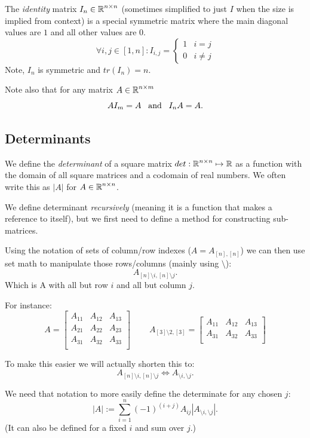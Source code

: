 The \emph{identity} matrix $I_n \in\operatorname{\mathbb{R}}^{n\times n}$ (sometimes simplified to just $I$ when the size is implied from context) 
is a special symmetric matrix where the main diagonal values are $1$ and all other values are $0$.
\[
\forall i,j \in [1,n]: I_{i,j} = \begin{cases} 1 & i=j\\ 0 & i\ne j\end{cases}
\]
Note, $I_n$ is symmetric and $tr(I_n)=n$.

Note also that for any matrix $A\in\operatorname{\mathbb{R}}^{n\times m}$ 
\[
AI_m = A \;\;\;\textnormal{and}\;\;\; I_nA = A.
\]


\subsection{Determinants}
We define the \emph{determinant} of a square matrix $det: \operatorname{\mathbb{R}}^{n\times n} \mapsto \operatorname{\mathbb{R}}$ 
as a function with the domain of all square matrices and a codomain of real numbers. 
We often write this as $|A|$ for $A\in\operatorname{\mathbb{R}}^{n\times n}$. 

We define determinant \emph{recursively} (meaning it is a function that makes a reference to itself), 
but we first need to define a method for constructing sub-matrices. 

Using the notation of sets of column/row indexes ($A = A_{[n],[n]}$) we can then use set math to manipulate those rows/columns (mainly using $\setminus$): 
\[A_{[n]\setminus i,[n]\setminus j}.\]
Which is A with all but row $i$ and all but column $j$. 

For instance: 
\[A = \left[\begin{matrix}A_{11} & A_{12} & A_{13}\\ A_{21} & A_{22} & A_{23}\\ A_{31} & A_{32} & A_{33}\\\end{matrix}\right] \;\;\;\;\;\;\;\;
A_{[3]\setminus 2,[3]} = \left[\begin{matrix}A_{11} & A_{12} & A_{13}\\ A_{31} & A_{32} & A_{33}\\\end{matrix}\right]\]

To make this easier we will actually shorten this to: 
\[A_{[n]\setminus i,[n]\setminus j} \iff A_{\setminus i,\setminus j}.\]

We need that notation to more easily define the determinate for any chosen $j$:
\[
|A| := \sum_{i=1}^n  (-1)^{(i+j)}  A_{ij} \left|A_{\setminus i,\setminus j}\right|.
\]
(It can also be defined for a fixed $i$ and sum over $j$.)

